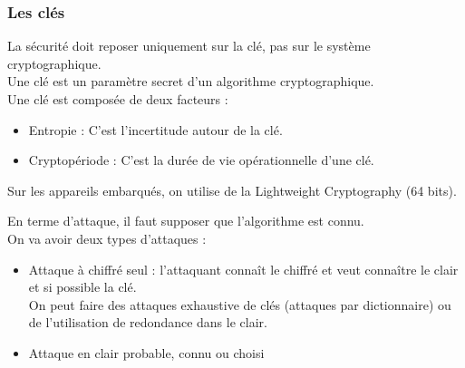 \subsubsection{Les clés}
La sécurité doit reposer uniquement sur la clé, pas sur le système cryptographique.\\
Une clé est un paramètre secret d'un algorithme cryptographique.\\
Une clé est composée de deux facteurs :
\begin{itemize}
 \item Entropie : C'est l'incertitude autour de la clé.
 \item Cryptopériode : C'est la durée de vie opérationnelle d'une clé.
\end{itemize}
Sur les appareils embarqués, on utilise de la Lightweight Cryptography (64 bits).\\\par
En terme d'attaque, il faut supposer que l'algorithme est connu.\\
On va avoir deux types d'attaques :
\begin{itemize}
 \item Attaque à chiffré seul : l'attaquant connaît le chiffré et veut connaître le clair et si possible la clé.\\On peut faire des attaques exhaustive de clés (attaques par dictionnaire) ou de l'utilisation de redondance dans le clair.
 \item Attaque en clair probable, connu ou choisi
\end{itemize}
